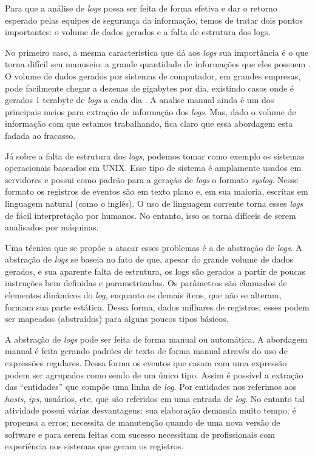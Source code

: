 \documentclass[
	12pt,				%
	openright,			%
	twoside,			%
	a4paper,			%
	english,			%
	spanish,			%
	brazil,				%
	]{abntex2}
\begin{document}
Para que a análise de \emph{logs} possa ser feita de forma efetiva e dar o retorno esperado pelas equipes de segurança da informação, temos de tratar dois pontos importantes: o volume de dados gerados e a falta de estrutura dos logs.

No primeiro caso, a mesma característica que dá aos \emph{logs} sua importância é o que torna difícil seu manuseio: a grande quantidade de informações que eles possuem \cite{brugger2001data,miranskyy2016data,nagappan2010abstracting,vaarandi2003data}. O volume de dados gerados por sistemas de computador, em grandes empresas, pode facilmente chegar a dezenas de gigabytes por dia, existindo casos onde é gerados 1 terabyte de \emph{logs} a cada dia \cite{yen2013beehive}. A analise manual ainda é um dos principais meios para extração de informação dos \emph{logs}. Mas, dado o volume de informação com que estamos trabalhando, fica claro que essa abordagem esta fadada ao fracasso.

Já sobre a falta de estrutura dos \emph{logs}, podemos tomar como exemplo os sistemas operacionais baseados em UNIX\texttrademark. Esse tipo de sistema é amplamente usados em servidores \cite{w3techs-osusage} e possui como padrão para a geração de \emph{logs} o formato \emph{syslog}. Nesse formato os registros de eventos são em texto plano e, em sua maioria, escritas em linguagem natural (como o inglês). O uso de linguagem corrente torna esses \emph{logs} de fácil interpretação por humanos. No entanto, isso os torna difíceis de serem analisados por máquinas.

Uma técnica que se propõe a atacar esses problemas é a de abstração de \emph{logs}. A abstração de \emph{logs} se baseia no fato de que, apesar do grande volume de dados gerados, e sua aparente falta de estrutura, os logs são gerados a partir de poucas instruções bem definidas e parametrizadas. Os parâmetros são chamados de elementos dinâmicos do \emph{log}, enquanto os demais itens, que não se alteram, formam sua parte estática. Dessa forma, dados milhares de registros, esses podem ser mapeados (abstraídos) para alguns poucos tipos básicos.

A abstração de \emph{logs} pode ser feita de forma manual ou automática. A abordagem manual é feita gerando padrões de texto de forma manual através do uso de expressões regulares. Dessa forma os eventos que casam com uma expressão podem ser agrupados como sendo de um único tipo. Assim é possível a extração das ``entidades'' que compõe uma linha de \emph{log}. Por entidades nos referimos aos \emph{hosts}, \emph{ips}, usuários, etc, que são referidos em uma entrada de \emph{log}. No entanto tal atividade possui várias desvantagens: sua elaboração demanda muito tempo; é propensa a erros; necessita de manutenção quando de uma nova versão de software e para serem feitas com sucesso necessitam de profissionais com experiência nos sistemas que geram os registros.
\end{document}
